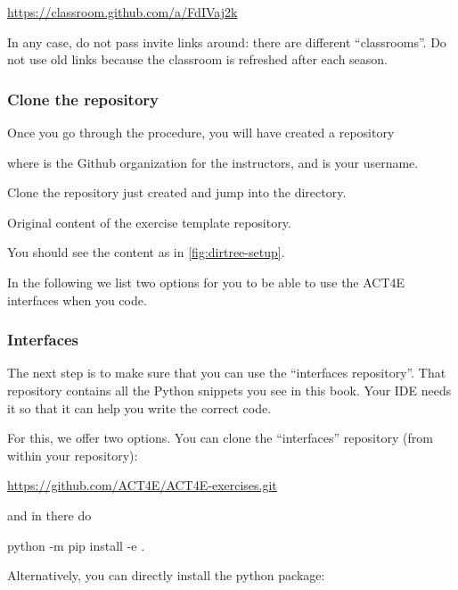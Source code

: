 \url{https://classroom.github.com/a/FdIVaj2k}

In any case, do not pass invite links around: there are different ``classrooms''.
Do not use old links because the classroom is refreshed after each season.

\subsubsection{Clone the repository}

Once you go through the procedure, you will have created a repository

\begin{quote}
\end{quote}
where  is the Github organization for the instructors, and  is your username.

Clone the repository just created and jump into the directory.

\begin{marginfigure}
	\caption{Original content of the exercise template repository.}
	\label{fig:dirtree-setup}
\end{marginfigure}

You should see the content as in \cref{fig:dirtree-setup}.

In the following we list two options for you to be able to use the ACT4E interfaces when you code.

\subsubsection{Interfaces}

The next step is to make sure that you can use the ``interfaces repository''.
That repository contains all the Python snippets you see in this book.
Your IDE needs it so that it can help you write the correct code.

For this, we offer two options.
You can clone the ``interfaces'' repository (from within your repository):

\url{https://github.com/ACT4E/ACT4E-exercises.git}

and in there do

\begin{console}
	python -m pip install -e .
\end{console}

Alternatively, you can directly install the python package:

